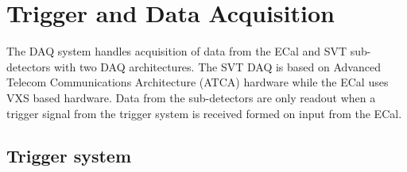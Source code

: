 \documentclass[final,3p,times,twocolumn]{elsarticle}
\begin{document}


\section{Trigger and Data Acquisition}

The DAQ system handles acquisition of data from the ECal and SVT sub-detectors  with 
two DAQ architectures. The SVT DAQ is based on Advanced Telecom Communications Architecture 
(ATCA) hardware while the ECal uses VXS based hardware. Data from the sub-detectors are only 
readout when a trigger signal from the trigger system is received formed on input from the ECal. 
\subsection{Trigger system}
\label{sec:trigger}
\end{document}
